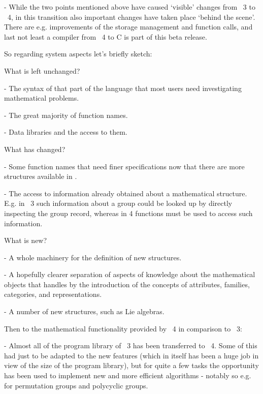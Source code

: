   \item{-}
    While the two  points mentioned above  have  caused `visible' changes
    from {\GAP}~3 to {\GAP}~4, in  this transition also important changes
    have taken place `behind the scene'.  There are e.g.  improvements of
    the  storage  management and function  calls,   and last  not least a
    compiler from {\GAP}~4 to C is part of this beta release.
\endlist

So regarding system aspects let's briefly sketch:

What is left unchanged?

\beginlist
  \item{-}
    The syntax of that part  of the {\GAP} language  that most users need
    investigating mathematical problems.

  \item{-}
    The great majority of function names.

  \item{-}
    Data libraries and the access to them.
\enditems

What has changed? 

\beginlist
  \item{-}
    Some function names that need finer specifications now that there are
    more structures available in {\GAP}.

  \item{-}
    The access to  information   already obtained about  a   mathematical
    structure.  E.g.  in {\GAP}~3 such information about a group could be
    looked up by directly inspecting the  group record, whereas in {\GAP}
    4 functions must be used to access such information.
\endlist

What is new?

\beginlist
  \item{-}
    A whole machinery for the definition of new structures. 

  \item{-}
    A  hopefully  clearer separation of  aspects  of knowledge  about the
    mathematical objects that {\GAP} handles  by the introduction of  the
    concepts of attributes, families, categories, and representations.

  \item{-}
    A number of new structures, such as  Lie algebras.
\enditems

Then to the mathematical functionality provided by {\GAP}~4 in comparison
to {\GAP}~3:

\beginlist
  \item{-}
    Almost all of the program library of {\GAP}~3 has been transferred to
    {\GAP}~4.   Some of this had  just to be adapted to  the new features
    (which in  itself has been  a huge  job in view   of the size  of the
    program library), but for quite a  few tasks the opportunity has been
    used to implement new and more efficient algorithms - notably so e.g.
    for permutation groups and polycyclic groups.

